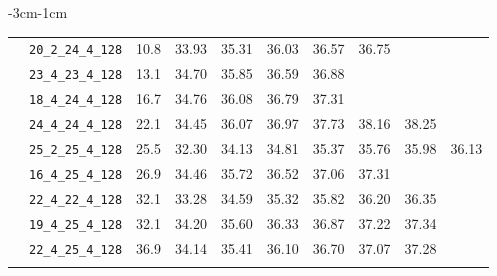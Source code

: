 \documentclass[12pt, a4paper, twoside]{report}
\begin{document}
\begin{table}[htbp]
\begin{adjustwidth}{-3cm}{-1cm}
\begin{tabular}{llrrrrrrrr}
   & \texttt{20\_2\_24\_4\_128} & 10.8 & 33.93 & 35.31 & 36.03 & 36.57 & 36.75 &   &   \\
   & \texttt{23\_4\_23\_4\_128} & 13.1 & 34.70 & 35.85 & 36.59 & 36.88 &   &   &   \\
   & \texttt{18\_4\_24\_4\_128} & 16.7 & 34.76 & 36.08 & 36.79 & 37.31 &   &   &   \\
   & \texttt{24\_4\_24\_4\_128} & 22.1 & 34.45 & 36.07 & 36.97 & 37.73 & 38.16 & 38.25 &   \\
   & \texttt{25\_2\_25\_4\_128} & 25.5 & 32.30 & 34.13 & 34.81 & 35.37 & 35.76 & 35.98 & 36.13 \\
   & \texttt{16\_4\_25\_4\_128} & 26.9 & 34.46 & 35.72 & 36.52 & 37.06 & 37.31 &   &   \\
   & \texttt{22\_4\_22\_4\_128} & 32.1 & 33.28 & 34.59 & 35.32 & 35.82 & 36.20 & 36.35 &   \\
   & \texttt{19\_4\_25\_4\_128} & 32.1 & 34.20 & 35.60 & 36.33 & 36.87 & 37.22 & 37.34 &   \\
   & \texttt{22\_4\_25\_4\_128} & 36.9 & 34.14 & 35.41 & 36.10 & 36.70 & 37.07 & 37.28 &   \\
\addlinespace
\bottomrule
\end{tabular}
\end{adjustwidth}
\end{table}

\end{document}
